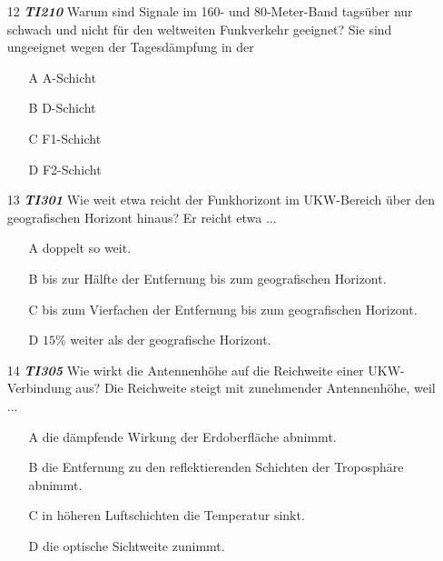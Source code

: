 \begin{enumerate} 
\itemsep1pt\parskip0pt
\item[12] \emph{\textbf{TI210}}   Warum sind Signale im 160- und 80-Meter-Band tagsüber nur schwach und nicht für den weltweiten Funkverkehr geeignet? Sie sind ungeeignet wegen der Tagesdämpfung in der
	\begin{enumerate}
	\itemsep1pt\parskip0pt
		\item[A] A-Schicht
		\item[B] D-Schicht
		\item[C] F1-Schicht
		\item[D] F2-Schicht
	\end{enumerate}
\end{enumerate}


\begin{enumerate} 
\itemsep1pt\parskip0pt
\item[13] \emph{\textbf{TI301}}   Wie weit etwa reicht der Funkhorizont im UKW-Bereich über den geografischen Horizont hinaus? Er reicht etwa ...
	\begin{enumerate}
	\itemsep1pt\parskip0pt
		\item[A] doppelt so weit.
		\item[B] bis zur Hälfte der Entfernung bis zum geografischen Horizont.
		\item[C] bis zum Vierfachen der Entfernung bis zum geografischen Horizont.
		\item[D] $15 \%$ weiter als der geografische Horizont.
	\end{enumerate}
\end{enumerate}

\begin{enumerate} 
\itemsep1pt\parskip0pt
\item[14] \emph{\textbf{TI305}}   Wie wirkt die Antennenhöhe auf die Reichweite einer UKW-Verbindung aus? Die Reichweite steigt mit zunehmender Antennenhöhe, weil ...
	\begin{enumerate}
	\itemsep1pt\parskip0pt
		\item[A] die dämpfende Wirkung der Erdoberfläche abnimmt.
		\item[B] die Entfernung zu den reflektierenden Schichten der Troposphäre abnimmt.
		\item[C] in höheren Luftschichten die Temperatur sinkt.
		\item[D] die optische Sichtweite zunimmt.
	\end{enumerate}
\end{enumerate}



